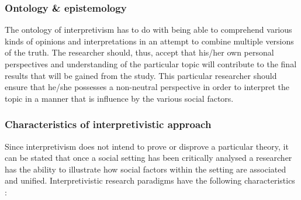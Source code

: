 \subsubsection{Ontology \& epistemology}
The ontology of interpretivism has to do with being able to comprehend various kinds of opinions and interpretations in an attempt to combine multiple versions of the truth. The researcher should, thus, accept that his/her own personal perspectives and understanding of the particular topic will contribute to the final results that will be gained from the study.  This particular researcher should ensure that he/she possesses a non-neutral perspective in order to interpret the topic in a manner that is influence by the various social factors.
\subsubsection{Characteristics of interpretivistic approach}
Since interpretivism does not intend to prove or disprove a particular theory, it can be stated that once a social setting has been critically analysed a researcher has the ability to illustrate how social factors within the setting are associated and unified. Interpretivistic research paradigms have the following characteristics \cite{OatesJ2006}: 
